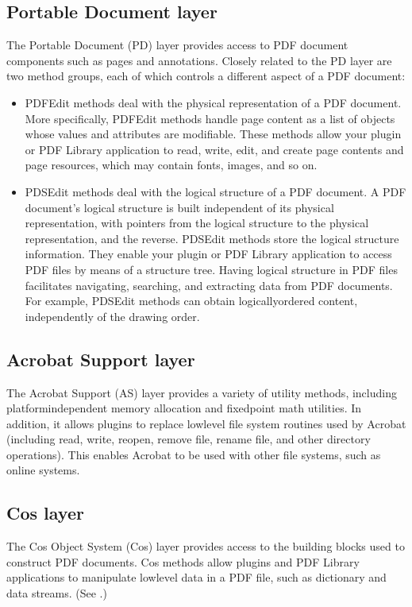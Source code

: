 \documentclass[letterpaper,12pt,english,openany,oneside]{sphinxmanual}
\begin{document}
\subsection{Portable Document layer}
\label{\detokenize{index:portable-document-layer}}
The Portable Document (PD) layer provides access to PDF document components such as pages and annotations. Closely related to the PD layer are two method groups, each of which controls a different aspect of a PDF document:
\begin{itemize}
\item {} 
PDFEdit methods deal with the physical representation of a PDF document. More specifically, PDFEdit methods handle page content as a list of objects whose values and attributes are modifiable. These methods allow your plugin or PDF Library application to read, write, edit, and create page contents and page resources, which may contain fonts, images, and so on.

\item {} 
PDSEdit methods deal with the logical structure of a PDF document. A PDF document’s logical structure is built independent of its physical representation, with pointers from the logical structure to the physical representation, and the reverse. PDSEdit methods store the logical structure information. They enable your plugin or PDF Library application to access PDF files by means of a structure tree. Having logical structure in PDF files facilitates navigating, searching, and extracting data from PDF documents. For example, PDSEdit methods can obtain logically\sphinxhyphen{}ordered content, independently of the drawing order.

\end{itemize}


\subsection{Acrobat Support layer}
\label{\detokenize{index:acrobat-support-layer}}
The Acrobat Support (AS) layer provides a variety of utility methods, including platform\sphinxhyphen{}independent memory allocation and fixed\sphinxhyphen{}point math utilities. In addition, it allows plugins to replace low\sphinxhyphen{}level file system routines used by Acrobat (including read, write, reopen, remove file, rename file, and other directory operations). This enables Acrobat to be used with other file systems, such as on\sphinxhyphen{}line systems.


\subsection{Cos layer}
\label{\detokenize{index:cos-layer}}
The Cos Object System (Cos) layer provides access to the building blocks used to construct PDF documents. Cos methods allow plugins and PDF Library applications to manipulate low\sphinxhyphen{}level data in a PDF file, such as dictionary and data streams. (See .)
\end{document}
